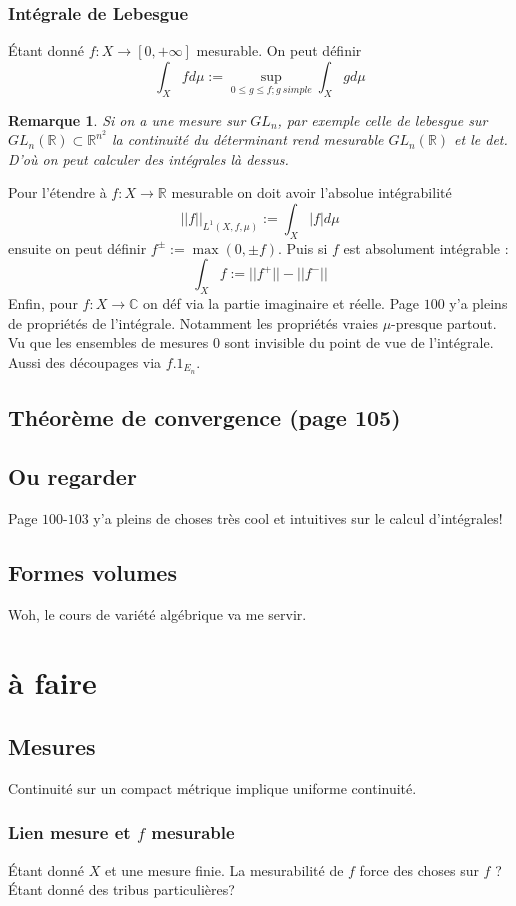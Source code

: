 \documentclass[a4paper,12pt]{book}
\newcommand{\R}{\mathbb{R}}
\newcommand{\C}{\mathbb{C}}
\theoremstyle{plain}
\newtheorem{rem}{Remarque}
\theoremstyle{definition}
\theoremstyle{remark}
\begin{document}
\subsection{Intégrale de Lebesgue}
Étant donné $f\colon X\to [0,+\infty]$ mesurable.
On peut définir
\[\int_X fd\mu:=\sup_{0\leq g\leq f;g~simple}\int_X gd\mu\]
\begin{rem}
  Si on a une mesure sur $GL_n$, par exemple celle de lebesgue
  sur $GL_n(\R)\subset \R^{n^2}$ la continuité du déterminant
  rend mesurable $GL_n(\R)$ et le det. D'où on peut calculer
  des intégrales là dessus. 
\end{rem}
Pour l'étendre à $f\colon X\to \R$ mesurable on doit avoir 
l'absolue intégrabilité
\[||f||_{L^1(X,f,\mu)}:=\int_X |f|d\mu\]
ensuite on peut définir $f^\pm:=\max(0,\pm f)$. 
Puis si $f$ est absolument intégrable :
\[\int_X f:=||f^+||-||f^-||\]
Enfin, pour $f\colon X\to \C$ on déf via la partie imaginaire
et réelle. Page $100$ y'a pleins de propriétés de l'intégrale.
Notamment les
propriétés vraies $\mu$-presque partout. Vu que les ensembles
de mesures $0$ sont invisible du point de vue de l'intégrale.
Aussi des découpages via $f.1_{E_n}$. 

\section{Théorème de convergence (page 105)}

\section{Ou regarder}
Page $100$-$103$ y'a pleins de choses très cool et intuitives
sur le calcul d'intégrales!

\section{Formes volumes}
Woh, le cours de variété algébrique va me servir.

\chapter{à faire}

\section{Mesures}
Continuité sur un compact métrique implique uniforme continuité.
\subsection{Lien mesure et $f$ mesurable}
Étant donné $X$ et une mesure finie. La mesurabilité de $f$
force des choses sur $f$ ? Étant donné des tribus particulières?

\end{document}
